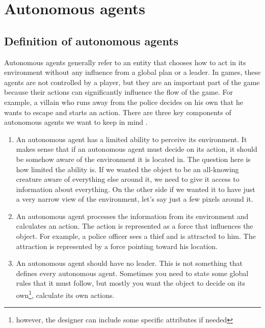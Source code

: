 \documentclass[10pt,twoside,english,a4paper]{article}
\begin{document}
\section{Autonomous agents} \label{autonomous agents}

\subsection{Definition of autonomous agents} \label{definition of a.a.}

Autonomous agents generally refer to an entity that chooses 
how to act in its environment without any influence from a global 
plan or a leader. In games, these agents are not controlled by a 
player, but they are an important part of the game because their actions
can significantly influence the flow of the game. For example, 
a villain who runs away from the police decides on his own that he
wants to escape and starts an action. There are three key 
components of autonomous agents we want to keep in mind 
\cite{Verhagen}. 

\begin{enumerate}
    \item An autonomous agent has a limited ability to perceive its 
    environment. It makes sense that if an autonomous agent must decide 
    on its action, it should be somehow aware of the environment it 
    is located in. The question here is how limited the ability is. 
    If we wanted the object to be an all-knowing creature aware of 
    everything else around it, we need to give it access to 
    information about everything. On the other side if we wanted it 
    to have just a very narrow view of the environment, let’s say just 
    a few pixels around it.
    
    \item An autonomous agent processes the information from its 
    environment and calculates an action. The action is represented 
    as a force that influences the object. For example, a police 
    officer sees a thief and is attracted to him. The attraction is 
    represented by a force pointing toward his location. 
    
    \item An autonomous agent should have no leader. This is not 
    something that defines every autonomous agent. Sometimes you need 
    to state some global rules that it must follow, but mostly you want 
    the object to decide on its own\footnote{however, the designer can 
    include some specific attributes if needed}, calculate its own 
    actions.

\end{enumerate}
\end{document}
